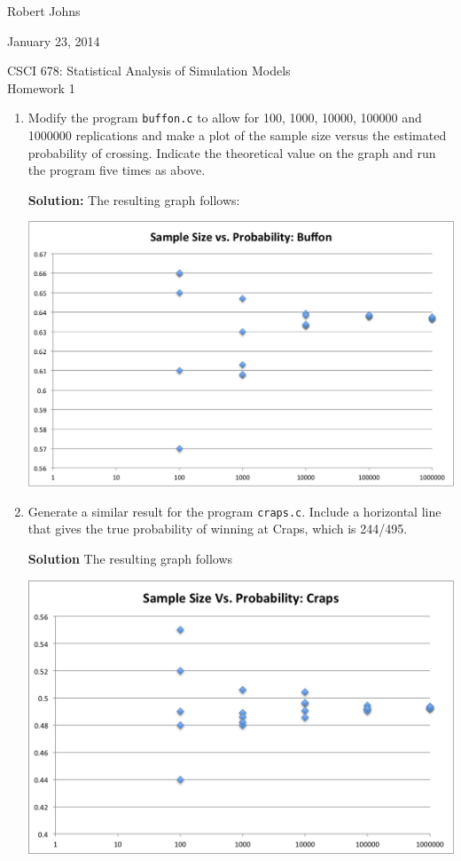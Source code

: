 \documentclass[11pt]{article} %
\begin{document}
\hfill Robert Johns

\hfill January 23, 2014

\begin{center} {\Large CSCI 678: Statistical Analysis of Simulation Models}\\{\large Homework 1}\end{center}

\begin{enumerate}

\item Modify the program \texttt{buffon.c} to allow for 100, 1000, 10000, 100000 and 1000000 replications and make a plot of the sample size versus the estimated probability of crossing.  Indicate the theoretical value on the graph and run the program five times as above.

{\bf Solution:} The resulting graph follows:

\includegraphics[scale = 0.65]{asm1.png}

\item Generate a similar result for the program \texttt{craps.c}.  Include a horizontal line that gives the true probability of winning at Craps, which is 244/495.  

{\bf Solution} The resulting graph follows

\includegraphics[scale = .6]{asm2.png}


\end{enumerate}
\end{document}
